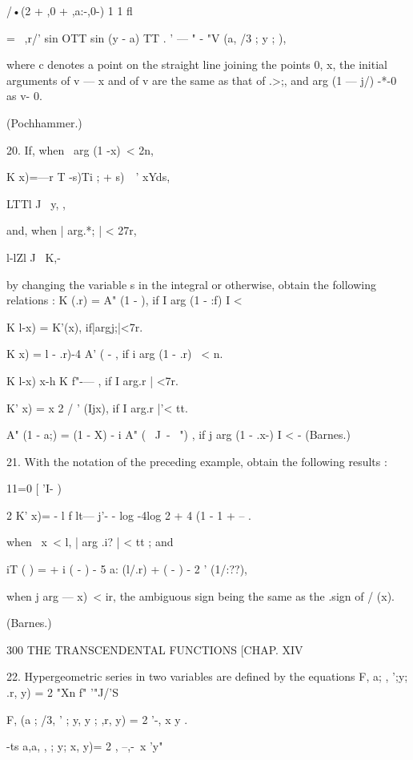 /•(2 + ,0 + ,a:-,0-) 1 1 fl 



= \   ,r/' sin OTT sin (y - a) TT .  ' — " - "V (a, /3 ; y ;  ), 

where c denotes a point on the straight line joining the points 0, x, the initial arguments 
of v — x and of v are the same as that of .>;, and arg (1 — j/) -*-0 as v- 0. 

(Pochhammer.) 

20. If, when \ arg (1 -x)\ <  2n, 

K x)=—r  T -s)Ti ; + s)\ \  '  xYds, 

LTTl J \  y, , 

and, when | arg.*; | < 27r, 

l-lZl J \ K,- 

by changing the variable s in the integral or otherwise, obtain the following relations : 
K (.r) = A" (1 -  ), if I arg (1 - :f) I <    

K l-x) = K'(x), if|argj;|<7r. 

K x) =  l - .r)-4 A' ( -  , if i arg (1 - .r) \ < n. 

K l-x) x-h K f"-—   , if I arg.r | <7r. 



K'  x) = x 2 / ' (Ijx), if I arg.r |'< tt. 

A" (1 - a;) = (1 - X) - i A" (  \ J\ - \ ") , if j arg (1 - .x-) I <  - (Barnes.) 

21. With the notation of the preceding example, obtain the following results : 

11=0 [ 'I- ) 

2 K'  x)= - l  f lt— j'- -  log -4log 2 + 4 (1 - 1 + --   . 

when \ x\ < l, | arg .i? | < tt ; and 

iT ( ) = + i ( -  ) - 5 a: (l/.r) + ( -  ) - 2  ' (1/:??), 

when j arg   — x)\ < ir, the ambiguous sign being the same as the .sign of / (x). 

(Barnes.) 



300 THE TRANSCENDENTAL FUNCTIONS [CHAP. XIV 

22. Hypergeometric series in two variables are defined by the equations 
F, a; , ';y; .r, y) = 2 "Xn f" '"J/'S 

F, (a ; /3,  ' ; y, y ; ,r, y) = 2   '-, x y . 



-ts a,a, , ; y; x, y)= 2   , --,-\  x 'y" 



